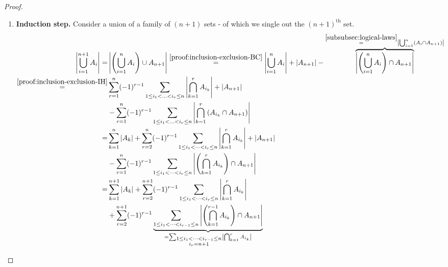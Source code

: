 \begin{proof}
\begin{enumerate}[partopsep=0em, topsep=0em, label=(\roman*)]
\item \textbf{Induction step.} \label{proof:inclusion-exclusion-IS}
Consider a union of a family of $(n+1)$ sets - of which we single out the $(n+1)^\text{th}$ set.
\vspace{-\baselineskip}
\begin{align}
\left|\bigcup_{i=1}^{n+1} A_i\right| = & \left|\left(\bigcup_{i=1}^n A_i\right) \cup A_{n+1}\right| \overset{\ref{proof:inclusion-exclusion-BC}}{=} \left|\bigcup_{i=1}^n A_i\right|+\left|A_{n+1}\right|-\overbrace{\left|\left(\bigcup_{i=1}^n A_i\right) \cap A_{n+1}\right|}^{\overset{\ref{subsubsec:logical-laws}}{=}\left|\bigcup_{i=1}^n\left(A_i \cap A_{n+1}\right)\right|} \label{eq:inclusion_exclusion:step1} \\
\overset{\ref{proof:inclusion-exclusion-IH}}{=} & \sum_{r=1}^n(-1)^{r-1} \sum_{1 \leq i_1<\ldots<i_r \leq n}\left|\bigcap_{k=1}^r A_{i_k}\right|+\left|A_{n+1}\right| \notag \\
& -\sum_{r=1}^n(-1)^{r-1} \sum_{1 \leq i_1<\ldots<i_r \leq n}\left|\bigcap_{k=1}^r\left(A_{i_k} \cap A_{n+1}\right)\right| \label{eq:inclusion_exclusion:step2} \\
= & \sum_{k=1}^{n}\left|A_k\right| +\sum_{r=2}^{n} (-1)^{r-1} \sum_{1\le i_1<\dots<i_r\le n} \left|\bigcap_{k=1}^r A_{i_k}\right| +\left|A_{n+1}\right| \notag \\
& -\sum_{r=1}^{n} (-1)^{r-1} \sum_{1\le i_1<\dots<i_{r}\le n} \left|\left(\bigcap_{k=1}^{r} A_{i_k}\right)\cap A_{n+1}\right| \label{eq:inclusion_exclusion:step3} \\
= & \sum_{k=1}^{n+1}\left|A_k\right| +\sum_{r=2}^{n+1} (-1)^{r-1} \sum_{1\le i_1<\dots<i_r\le n} \left|\bigcap_{k=1}^r A_{i_k}\right| \notag \\
& + \sum_{r=2}^{n+1} (-1)^{r-1} \underbrace{\sum_{1\le i_1<\dots<i_{r-1}\le n} \left| \left( \bigcap_{k=1}^{r-1} A_{i_k} \right) \cap A_{n+1}\right|}_{ = \sum_{\substack{1 \le i_1 < \dots < i_{r-1} \le n\\ i_r = n+1}} \left|\bigcap\nolimits_{k=1}^{r} A_{i_k}\right|} \label{eq:inclusion_exclusion:step4} \\

\end{align}
\end{enumerate}
\end{proof}
